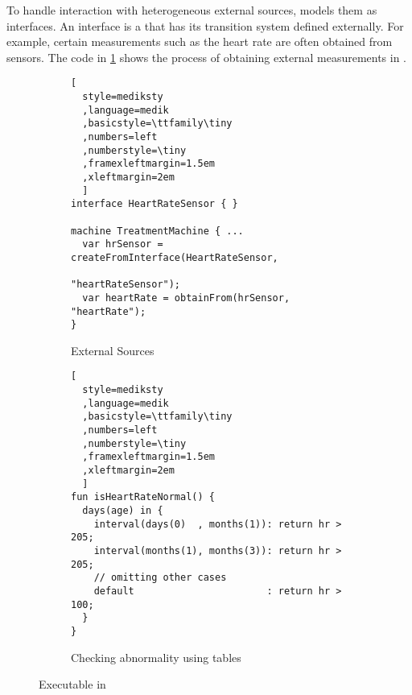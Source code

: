To handle interaction with heterogeneous external sources, \MediK{}
models them as interfaces. An interface is a \FSM{} that has its
transition system defined externally. For example, certain measurements
such as the heart rate are often obtained from sensors.
The code in \figurename{} \ref{fig:interface} shows the process
of obtaining external measurements in \MediK{}.

\begin{figure}[t]
  \begin{subfigure}[b]{0.5\textwidth}
\begin{lstlisting}[
  style=mediksty
  ,language=medik
  ,basicstyle=\ttfamily\tiny
  ,numbers=left
  ,numberstyle=\tiny
  ,framexleftmargin=1.5em
  ,xleftmargin=2em
  ]
interface HeartRateSensor { }

machine TreatmentMachine { ...
  var hrSensor = createFromInterface(HeartRateSensor,
                              "heartRateSensor");
  var heartRate = obtainFrom(hrSensor, "heartRate");
}
\end{lstlisting}\caption{External Sources}\label{fig:interface}
  \end{subfigure}
  \begin{subfigure}[b]{0.47\textwidth}
\begin{lstlisting}[
  style=mediksty
  ,language=medik
  ,basicstyle=\ttfamily\tiny
  ,numbers=left
  ,numberstyle=\tiny
  ,framexleftmargin=1.5em
  ,xleftmargin=2em
  ]
fun isHeartRateNormal() {
  days(age) in {
    interval(days(0)  , months(1)): return hr > 205;
    interval(months(1), months(3)): return hr > 205;
    // omitting other cases
    default                       : return hr > 100;
  }
}
\end{lstlisting}
  \caption{Checking abnormality using tables}\label{fig:hr-check-fun}
  \end{subfigure}
  \caption{Executable \BPGs{} in \MediK{}}
\end{figure}

